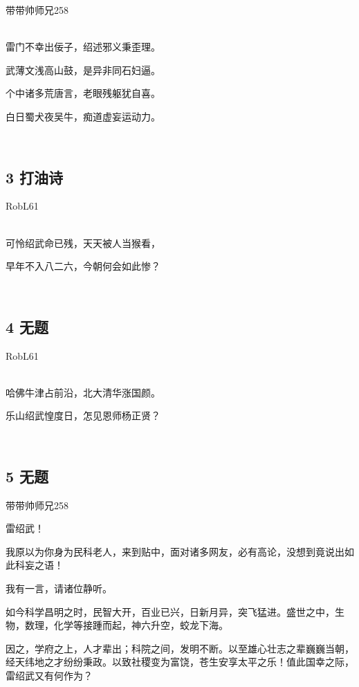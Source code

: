 带带帅师兄258

~\\
雷门不幸出佞子，绍述邪义秉歪理。

武薄文浅高山鼓，是异非同石妇逼。

个中诸多荒唐言，老眼残躯犹自喜。

白日蜀犬夜吴牛，痴道虚妄运动力。

~\\

\hypertarget{ux6253ux6cb9ux8bd7}{%
\subsection{3 打油诗}\label{ux6253ux6cb9ux8bd7}}

RobL61

~\\
可怜绍武命已残，天天被人当猴看，

早年不入八二六，今朝何会如此惨？

~\\

\hypertarget{ux65e0ux9898-2}{%
\subsection{4 无题}\label{ux65e0ux9898-2}}

RobL61

~\\
哈佛牛津占前沿，北大清华涨国颜。

乐山绍武惶度日，怎见恩师杨正贤？

~\\

\hypertarget{ux65e0ux9898-3}{%
\subsection{5 无题}\label{ux65e0ux9898-3}}

带带帅师兄258

雷绍武！

我原以为你身为民科老人，来到贴中，面对诸多网友，必有高论，没想到竟说出如此科妄之语！

我有一言，请诸位静听。

如今科学昌明之时，民智大开，百业已兴，日新月异，突飞猛进。盛世之中，生物，数理，化学等接踵而起，神六升空，蛟龙下海。

因之，学府之上，人才辈出；科院之间，发明不断。以至雄心壮志之辈巍巍当朝，经天纬地之才纷纷秉政。以致社稷变为富饶，苍生安享太平之乐！值此国幸之际，雷绍武又有何作为？

